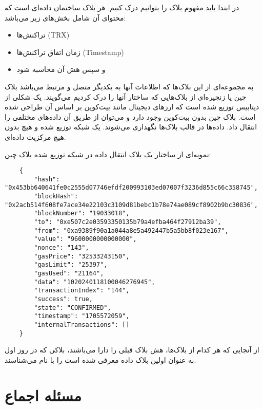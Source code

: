 \documentclass[10pt, a4paper]{article}
\begin{document}
در ابتدا باید مفهوم بلاک را بتوانیم درک کنیم. هر بلاک ساختمان داده‌ای است که
محتوای آن شامل بخش‌های زیر می‌باشد:

\begin{itemize}
    \item تراکنش‌ها (TRX)
    \item زمان اتفاق تراکنش‌ها (Timestamp)
    \item و سپس هش آن محاسبه شود
\end{itemize}

به مجموعه‌ای از این بلاک‌ها که اطلاعات آنها به یکدیگر متصل و مرتبط می‌باشد بلاک
چین یا زنجیره‌ای از بلاک‌هایی که ساختار آنها را درک کردیم می‌گویند. یک شکلی از
دیتابیس توزیع شده است که ارز‌های دیجیتال مانند بیت‌کوین بر اساس آن طراحی شده
است. بلاک چین بدون بیت‌کوین وجود دارد و می‌توان از طریق آن داده‌های مختلفی را
انتقال داد. داده‌ها در قالب بلاک‌ها نگهداری می‌شوند. یک شبکه توزیع شده و هیچ
بدون هیچ مرکزیت داده‌ای.

نمونه‌ای از ساختار یک بلاک انتقال داده در شبکه توزیع شده بلاک چین:

\begin{LTR}
    \begin{lstlisting}
    {
        "hash": "0x453bb640641fe0c2555d07746efdf200993103ed07007f3236d855c66c358745",
        "blockHash": "0x2acb514f608fe7ace34e22103c3109d81bebc1b78e74ae089cf8902b9bc30836",
        "blockNumber": "19033018",
        "to": "0xe507c2e03593350135b79a4efba464f27912ba39",
        "from": "0xa9389f90a1a044a8e5a492447b5a5bb8f023e167",
        "value": "9600000000000000",
        "nonce": "143",
        "gasPrice": "32533243150",
        "gasLimit": "25397",
        "gasUsed": "21164",
        "data": "1020240118100046276945",
        "transactionIndex": "144",
        "success": true,
        "state": "CONFIRMED",
        "timestamp": "1705572059",
        "internalTransactions": []
    }
    \end{lstlisting}
\end{LTR}

از آنجایی که هر کدام از بلاک‌ها، هش بلاک قبلی را دارا می‌باشند، بلاکی که در روز
اول به عنوان اولین بلاک داده معرفی شده است را با نام 
می‌شناسند.

\section{مسئله اجماع}
\end{document}
